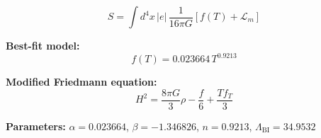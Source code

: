 
\begin{equation}
  S = \int d^4x \, |e| \, \frac{1}{16\pi G} \left[ f(T) + \mathcal{L}_m \right]
\end{equation}

\textbf{Best-fit model:}
\begin{equation}
  f(T) = 0.023664 \, T^{0.9213}
\end{equation}

\textbf{Modified Friedmann equation:}
\begin{equation}
  H^2 = \frac{8\pi G}{3} \rho - \frac{f}{6} + \frac{T f_T}{3}
\end{equation}

\textbf{Parameters:}
$\alpha = 0.023664$, \quad
$\beta = -1.346826$, \quad
$n = 0.9213$, \quad
$\Lambda_{\text{BI}} = 34.9532$